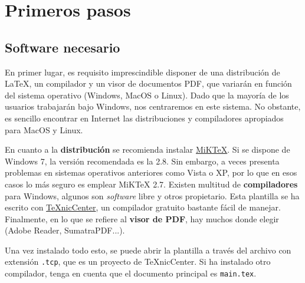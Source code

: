 \chapter {Primeros pasos}

\section{Software necesario}
En primer lugar, es requisito imprescindible disponer de una distribución de \LaTeX, un compilador y un visor de documentos PDF, que variarán en función del sistema operativo (Windows, MacOS o Linux). Dado que la mayoría de los usuarios trabajarán bajo Windows, nos centraremos en este sistema. No obstante, es sencillo encontrar en Internet las distribuciones y compiladores apropiados para MacOS y Linux.

En cuanto a la \textbf{distribución} se recomienda instalar \href{http://miktex.org/2.8/setup}{MiKTeX}. Si se dispone de Windows 7, la versión recomendada es la 2.8. Sin embargo, a veces presenta problemas en sistemas operativos anteriores como Vista o XP, por lo que en esos casos lo más seguro es emplear MiKTeX 2.7. Existen multitud de \textbf{compiladores} para Windows, algunos son \textit{software} libre y otros propietario. Esta plantilla se ha escrito con \href{http://www.texniccenter.org}{TeXnicCenter}, un compilador gratuito bastante fácil de manejar. Finalmente, en lo que se refiere al \textbf{visor de PDF}, hay muchos donde elegir (Adobe Reader, SumatraPDF...).

Una vez instalado todo esto, se puede abrir la plantilla a través del archivo con extensión \texttt{\small .tcp}, que es un proyecto de TeXnicCenter. Si ha instalado otro compilador, tenga en cuenta que el documento principal es \texttt{\small main.tex}.

